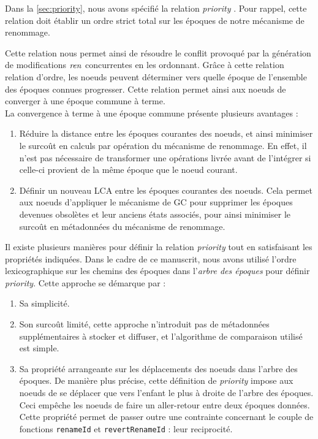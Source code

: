 \label{sec:alternative-priority}

Dans la \autoref{sec:priority}, nous avons spécifié la relation \emph{priority} .
Pour rappel, cette relation doit établir un ordre strict total sur les époques de notre mécanisme de renommage.

Cette relation nous permet ainsi de résoudre le conflit provoqué par la génération de modifications $\mathit{ren}$ concurrentes en les ordonnant.
Grâce à cette relation relation d'ordre, les noeuds peuvent déterminer vers quelle époque de l'ensemble des époques connues progresser.
Cette relation permet ainsi aux noeuds de converger à une époque commune à terme.\\

La convergence à terme à une époque commune présente plusieurs avantages :
\begin{enumerate}
    \item Réduire la distance entre les époques courantes des noeuds, et ainsi minimiser le surcoût en calculs par opération du mécanisme de renommage.
        En effet, il n'est pas nécessaire de transformer une opérations livrée avant de l'intégrer si celle-ci provient de la même époque que le noeud courant.
    \item Définir un nouveau \acf{LCA} entre les époques courantes des noeuds.
        Cela permet aux noeuds d'appliquer le mécanisme de \ac{GC} pour supprimer les époques devenues obsolètes et leur anciens états associés, pour ainsi minimiser le surcoût en métadonnées du mécanisme de renommage.
\end{enumerate}

Il existe plusieurs manières pour définir la relation \emph{priority} tout en satisfaisant les propriétés indiquées.
Dans le cadre de ce manuscrit, nous avons utilisé l'ordre lexicographique sur les chemins des époques dans l'\emph{arbre des époques} pour définir \emph{priority}.
Cette approche se démarque par :
\begin{enumerate}
    \item Sa simplicité.
    \item Son surcoût limité, \ie cette approche n'introduit pas de métadonnées supplémentaires à stocker et diffuser, et l'algorithme de comparaison utilisé est simple.
    \item Sa propriété arrangeante sur les déplacements des noeuds dans l'arbre des époques.
        De manière plus précise, cette définition de \emph{priority} impose aux noeuds de se déplacer que vers l'enfant le plus à droite de l'arbre des époques.
        Ceci empêche les noeuds de faire un aller-retour entre deux époques données.
        Cette propriété permet de passer outre une contrainte concernant le couple de fonctions \texttt{renameId} et \texttt{revertRenameId} : leur reciprocité.
\end{enumerate}

